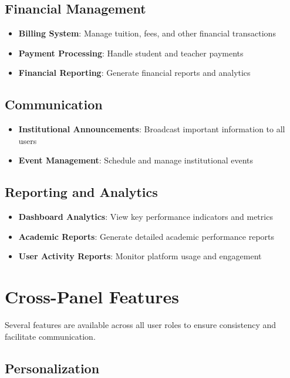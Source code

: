 \subsection{Financial Management}

\begin{itemize}
    \item \textbf{Billing System}: Manage tuition, fees, and other financial transactions
    \item \textbf{Payment Processing}: Handle student and teacher payments
    \item \textbf{Financial Reporting}: Generate financial reports and analytics
\end{itemize}

\subsection{Communication}

\begin{itemize}
    \item \textbf{Institutional Announcements}: Broadcast important information to all users
    \item \textbf{Event Management}: Schedule and manage institutional events
\end{itemize}

\subsection{Reporting and Analytics}

\begin{itemize}
    \item \textbf{Dashboard Analytics}: View key performance indicators and metrics
    \item \textbf{Academic Reports}: Generate detailed academic performance reports
    \item \textbf{User Activity Reports}: Monitor platform usage and engagement
\end{itemize}

\section{Cross-Panel Features}

Several features are available across all user roles to ensure consistency and facilitate communication.

\subsection{Personalization}

